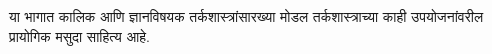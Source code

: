 \documentclass[../../include/open-logic-part]{subfiles}
\begin{document}

\begin{editorial}
या भागात कालिक आणि ज्ञानविषयक तर्कशास्त्रांसारख्या
मोडल तर्कशास्त्राच्या काही उपयोजनांवरील प्रायोगिक
मसुदा साहित्य आहे.
\end{editorial}



\OLEndPartHook
\end{document}
